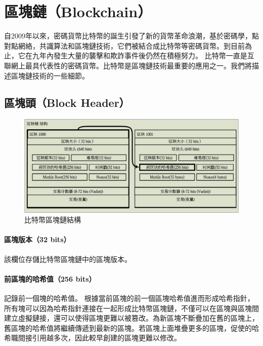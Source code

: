 	\section{區塊鏈（Blockchain）}
	自2009年以來，密碼貨幣比特幣的誕生引發了新的貨幣革命浪潮，基於密碼學，點對點網絡，共識算法和區塊鏈技術，它們被結合成比特幣等密碼貨幣。到目前為止，它在九年內發生大量的襲擊和欺詐事件後仍然在積極努力。 比特幣一直是互聯網上最具代表性的密碼貨幣。比特幣是區塊鏈技術最重要的應用之一。我們將描述區塊鏈技術的一些細節。

		\subsection{區塊頭（Block Header）}

		\begin{figure}[h]
			\centering
			\includegraphics[width = 1\textwidth]{blockchain.png}
			\caption{比特幣區塊鏈結構}\label{blockchain}
		\end{figure}

			\paragraph{區塊版本（32 bits）}該欄位存儲比特幣區塊鏈中的區塊版本。
			\paragraph{前區塊的哈希值（256 bits）}記錄前一個塊的哈希值。 根據當前區塊的前一個區塊哈希值進而形成哈希指針，所有塊可以因為哈希指針連接在一起形成比特幣區塊鏈，不僅可以在區塊與區塊間建立虛擬鏈接，還可以使得區塊更難以被篡改。為新區塊不斷疊加在舊的區塊上，舊區塊的哈希值將繼續傳遞到最新的區塊。若區塊上面堆疊更多的區塊，促使的哈希職間接引用越多次，因此較早創建的區塊更難以修改。
